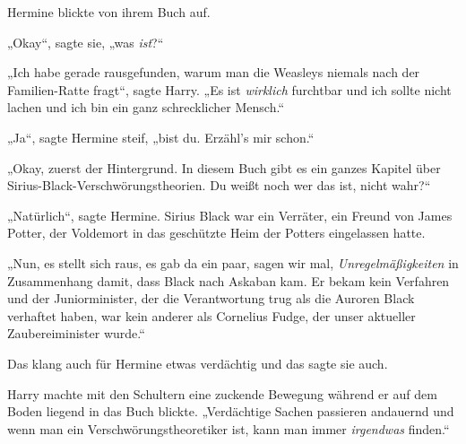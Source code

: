 Hermine blickte von ihrem Buch auf.

„Okay“, sagte sie, „was \emph{ist}?“

„Ich habe gerade rausgefunden, warum man die Weasleys niemals nach der Familien-Ratte fragt“, sagte Harry. „Es ist \emph{wirklich} furchtbar und ich sollte nicht lachen und ich bin ein ganz schrecklicher Mensch.“

„Ja“, sagte Hermine steif, „bist du. Erzähl’s mir schon.“

„Okay, zuerst der Hintergrund. In diesem Buch gibt es ein ganzes Kapitel über Sirius-Black-Verschwörungstheorien. Du weißt noch wer das ist, nicht wahr?“

„Natürlich“, sagte Hermine. Sirius Black war ein Verräter, ein Freund von James Potter, der Voldemort in das geschützte Heim der Potters eingelassen hatte.

„Nun, es stellt sich raus, es gab da ein paar, sagen wir mal, \emph{Unregelmäßigkeiten} in Zusammenhang damit, dass Black nach Askaban kam. Er bekam kein Verfahren und der Juniorminister, der die Verantwortung trug als die Auroren Black verhaftet haben, war kein anderer als Cornelius Fudge, der unser aktueller Zaubereiminister wurde.“

Das klang auch für Hermine etwas verdächtig und das sagte sie auch.

Harry machte mit den Schultern eine zuckende Bewegung während er auf dem Boden liegend in das Buch blickte. „Verdächtige Sachen passieren andauernd und wenn man ein Verschwörungstheoretiker ist, kann man immer \emph{irgendwas} finden.“

